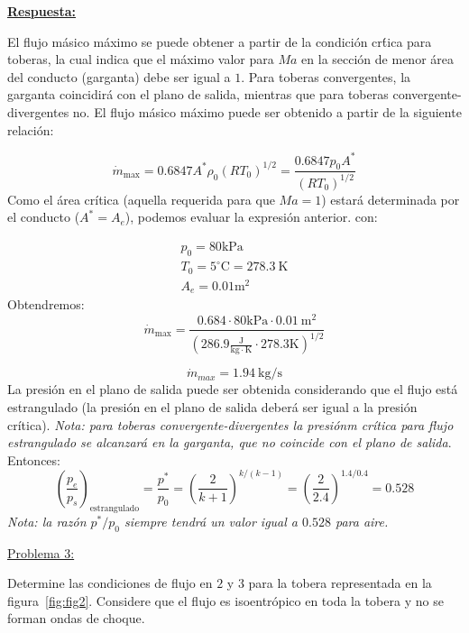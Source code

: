 \documentclass[11pt]{report}
\begin{document}
\underline{\textbf{Respuesta:}}

El flujo m\'asico m\'aximo se puede obtener a partir de la condici\'on cr\'tica para toberas, la cual indica que el m\'aximo valor para $Ma$ en la secci\'on de menor \'area del conducto (garganta) debe ser igual a $1$. Para toberas convergentes, la garganta coincidir\'a con el plano de salida, mientras que para toberas convergente-divergentes no. El flujo m\'asico m\'aximo puede ser obtenido  a partir de la siguiente relaci\'on:

$$
\dot{m}_{\max }=0.6847 A^{*} \rho_{0}\left(R T_{0}\right)^{1 / 2}=\frac{0.6847 p_{0} A^{*}}{\left(R T_{0}\right)^{1 / 2}}
$$
Como el \'area cr\'itica (aquella requerida para que $Ma=1$) estar\'a determinada por el conducto ($A^{*}=A_e$), podemos evaluar la expresi\'on anterior. con:

$$
\begin{array}{l}
p_{0}=80 \mathrm{kPa} \\
T_{0}=5^{\circ} \mathrm{C}=278.3 \mathrm{~K}\\
A_e=0.01 \text{m}^2
\end{array}
$$
Obtendremos:
$$
\dot{m}_{\max }=\frac{0.684\cdot80 \mathrm{kPa} \cdot 0.01 \mathrm{~m}^{2}}{\left(286.9 \frac{\mathrm{J}}{\mathrm{kg}\cdot\mathrm{K}} \cdot 278.3 \mathrm{K}\right)^{\mathrm{1/2}}}
$$

$$
\dot{m}_{max}=1.94 \mathrm{~kg} / \mathrm{s}
$$
La presi\'on en el plano de salida puede ser obtenida considerando que el flujo est\'a estrangulado (la presi\'on en el plano de salida deber\'a ser igual a la presi\'on cr\'itica). \textit{Nota: para toberas convergente-divergentes la presi\'onm cr\'itica para flujo estrangulado se alcanzar\'a en la garganta, que no coincide con el plano de salida}. Entonces:
$$
\left(\frac{p_{e}}{p_{s}}\right)_{\text {estrangulado}}=\frac{p^{*}}{p_{0}}=\left(\frac{2}{k+1}\right)^{k /(k-1)}=\left(\frac{2}{2.4}\right)^{1.4 / 0.4}=0.528
$$
\textit{Nota: la raz\'on $p^*/p_0$ siempre tendr\'a un valor igual a $0.528$ para aire.} 

\newpage
\underline {Problema 3:}
\vspace{0.2cm}

Determine las condiciones de flujo en $2$ y $3$ para la tobera representada en la figura~\ref{fig:fig2}. Considere que el flujo es isoentr\'opico en toda la tobera y no se forman ondas de choque.
\end{document}
